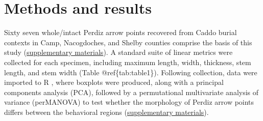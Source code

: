 \documentclass[smallextended]{svjour3}       %
\begin{document}
\hypertarget{methods-and-results}{%
\section{Methods and results}\label{methods-and-results}}

Sixty seven whole/intact Perdiz arrow points recovered from Caddo burial
contexts in Camp, Nacogdoches, and Shelby counties comprise the basis of
this study (\href{https://seldenlab.github.io/perdiz3/}{supplementary
materials}). A standard suite of linear metrics were collected for each
specimen, including maximum length, width, thickness, stem length, and
stem width (Table @ref\{tab:table1\}). Following collection, data were
imported to R \cite{RN8584}, where boxplots were produced, along with a
principal components analysis (PCA), followed by a permutational
multivariate analysis of variance (perMANOVA) to test whether the
morphology of Perdiz arrow points differs between the behavioral regions
(\href{https://seldenlab.github.io/perdiz3/}{supplementary materials}).
\end{document}
